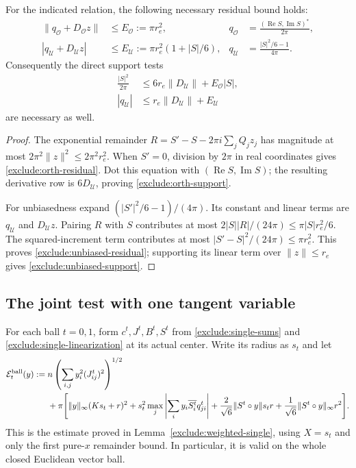 \begin{lemma}
\label{exclude:edge-taylor}
For the indicated relation, the following necessary residual bound
holds:
\begin{align}
 \|q_{\mathcal O}+D_{\mathcal O}z\|
 &\le E_{\mathcal O}:=\pi r_e^2,
 &q_{\mathcal O}&=\frac{(\operatorname{Re}S,\operatorname{Im}S)^*}{2\pi},
 \label{exclude:orth-residual}\\
 |q_{\mathcal U}+D_{\mathcal U}z|
 &\le E_{\mathcal U}:=\pi r_e^2(1+|S|/6),
 &q_{\mathcal U}&=\frac{|S|^2/6-1}{4\pi}.
 \label{exclude:unbiased-residual}
\end{align}
Consequently the direct support tests
\begin{align}
 \frac{|S|^2}{2\pi}
 &\le6r_e\|D_{\mathcal U}\|+E_{\mathcal O}|S|,
 \label{exclude:orth-support}\\
 |q_{\mathcal U}|&\le r_e\|D_{\mathcal U}\|+E_{\mathcal U}
 \label{exclude:unbiased-support}
\end{align}
are necessary as well.
\end{lemma}
\begin{proof}
The exponential remainder $R=S'-S-2\pi i\sum_jQ_jz_j$ has magnitude
at most $2\pi^2\|z\|^2\le2\pi^2r_e^2$.
When $S'=0$, division by $2\pi$ in real coordinates gives
\eqref{exclude:orth-residual}.
Dot this equation with $(\operatorname{Re}S,\operatorname{Im}S)$;
the resulting derivative row is $6D_{\mathcal U}$, proving
\eqref{exclude:orth-support}.

For unbiasedness expand $(|S'|^2/6-1)/(4\pi)$.
Its constant and linear terms are $q_{\mathcal U}$ and
$D_{\mathcal U}z$.
Pairing $R$ with $S$ contributes at most
$2|S||R|/(24\pi)\le\pi|S|r_e^2/6$.
The squared-increment term contributes at most
$|S'-S|^2/(24\pi)\le\pi r_e^2$.
This proves \eqref{exclude:unbiased-residual}; supporting its linear
term over $\|z\|\le r_e$ gives \eqref{exclude:unbiased-support}.
\end{proof}

\subsection{The joint test with one tangent variable}

For each ball $t=0,1$, form $c^t,J^t,B^t,S^t$ from
\eqref{exclude:single-sums} and \eqref{exclude:single-linearization}
at its actual center.  Write its radius as $s_t$ and let
\begin{align}
 \mathcal E_t^{\mathrm{ball}}(y):={}&n
   \left(\sum_{i,j}y_i^2(J^t_{ij})^2\right)^{1/2}\notag\\
 &+\pi\Biggl[
   \|y\|_\infty(Ks_t+r)^2
   +s_t^2\max_j\left|\sum_i y_i\overline{S_i^t}q^t_{ji}\right|
   +\frac{2}{\sqrt6}\|S^t\circ y\|s_tr
   +\frac1{\sqrt6}\|S^t\circ y\|_\infty r^2\Biggr].
 \label{exclude:ball-error}
\end{align}
This is the estimate proved in Lemma~\ref{exclude:weighted-single},
using $X=s_t$ and only the first pure-$x$ remainder bound.  In
particular, it is valid on the whole closed Euclidean vector ball.


